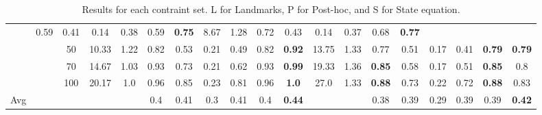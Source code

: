 \documentclass[letterpaper]{article}
\begin{document}
\begin{table*}[]
\begin{tabular}{ccccccccccccccccccc}
 & 0.59
 & 0.41
 & 0.14
 & 0.38
 & 0.59
 & \textbf{0.75} & 8.67 & 1.28

 & 0.72
 & 0.43
 & 0.14
 & 0.37
 & 0.68
 & \textbf{0.77}
\\ & & 50 & 10.33 & 1.22

 & 0.82
 & 0.53
 & 0.21
 & 0.49
 & 0.82
 & \textbf{0.92} & 13.75 & 1.33

 & 0.77
 & 0.51
 & 0.17
 & 0.41
 & \textbf{0.79}
 & \textbf{0.79}
\\ & & 70 & 14.67 & 1.03

 & 0.93
 & 0.73
 & 0.21
 & 0.62
 & 0.93
 & \textbf{0.99} & 19.33 & 1.36

 & \textbf{0.85}
 & 0.58
 & 0.17
 & 0.51
 & \textbf{0.85}
 & 0.8
\\ & & 100 & 20.17 & 1.0

 & 0.96
 & 0.85
 & 0.23
 & 0.81
 & 0.96
 & \textbf{1.0} & 27.0 & 1.33

 & \textbf{0.88}
 & 0.73
 & 0.22
 & 0.72
 & \textbf{0.88}
 & 0.83 \\ \hline
\hline
Avg & &  & &  & 0.4 & 0.41 & 0.3 & 0.41 & 0.4 & \textbf{0.44} & &  & 0.38 & 0.39 & 0.29 & 0.39 & 0.39 & \textbf{0.42}\\
\bottomrule
\end{tabular}\\
\caption{Results for each contraint set. L for Landmarks, P for Post-hoc, and S for State equation.}
\end{table*}
\end{document}
